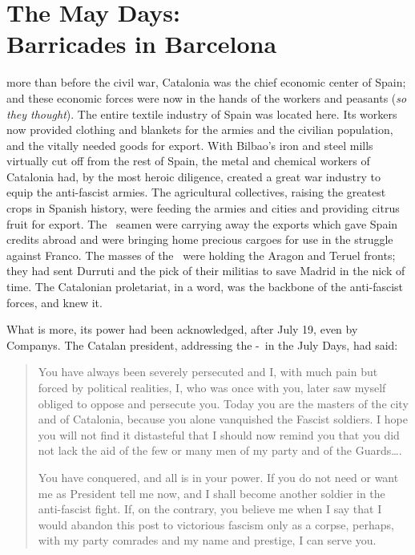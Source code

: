 \chapter[The May Days]{The May Days: \\ Barricades in Barcelona}

 more than before the civil war, Catalonia was the chief economic center of Spain; and these economic forces were now in the hands of the workers and peasants (\emph{so they thought}). The entire textile industry of Spain was located here. Its workers now provided clothing and blankets for the armies and the civilian population, and the vitally needed goods for export. With Bilbao’s iron and steel mills virtually cut off from the rest of Spain, the metal and chemical workers of Catalonia had, by the most heroic diligence, created a great war industry to equip the anti-fascist armies. The agricultural collectives, raising the greatest crops in Spanish history, were feeding the armies and cities and providing citrus fruit for export. The \CNT\ seamen were carrying away the exports which gave Spain credits abroad and were bringing home precious cargoes for use in the struggle against Franco. The masses of the \CNT\ were holding the Aragon and Teruel fronts; they had sent Durruti and the pick of their militias to save Madrid in the nick of time. The Catalonian proletariat, in a word, was the backbone of the anti-fascist forces, and knew it.
\nowidow

What is more, its power had been acknowledged, after July 19, even by Companys. The Catalan president, addressing the \CNT-\FAI\ in the July Days, had said:

\begin{quotation}
  You have always been severely persecuted and I, with much pain but forced by political realities, I, who was once with you, later saw myself obliged to oppose and persecute you. Today you are the masters of the city and of Catalonia, because you alone vanquished the Fascist soldiers. I hope you will not find it distasteful that I should now remind you that you did not lack the aid of the few or many men of my party and of the Guards\dots.
  
  You have conquered, and all is in your power. If you do not need or want me as President tell me now, and I shall become another soldier in the anti-fascist fight. If, on the contrary, you believe me when I say that I would abandon this post to victorious fascism only as a corpse, perhaps, with my party comrades and my name and prestige, I can serve you.
\end{quotation}

